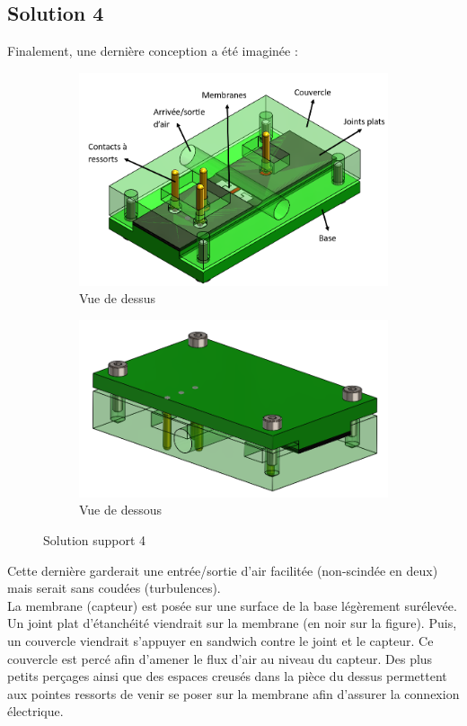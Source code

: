 \subsection{Solution 4}
Finalement, une dernière conception a été imaginée :
\begin{figure}[H]
    \centering
    \begin{subfigure}{0.45\textwidth}
        \includegraphics[scale = 0.45]{images/Design5_dessus.png}
        \caption{Vue de dessus}
    \end{subfigure}
    \hspace{1cm}
    \begin{subfigure}{0.3\textwidth}
        \includegraphics[scale = 0.3]{images/Design5_dessous.png}
        \caption{Vue de dessous}
    \end{subfigure}
    \caption{Solution support 4}
    \label{fig:solution4}
\end{figure}

Cette dernière garderait une entrée/sortie d'air facilitée (non-scindée en deux) mais serait sans coudées (turbulences).\\
La membrane (capteur) est posée sur une surface de la base légèrement surélevée. Un joint plat d'étanchéité viendrait sur la membrane (en noir
sur la figure). Puis, un couvercle viendrait s'appuyer en sandwich contre le joint et le capteur. Ce couvercle est percé afin d'amener le flux 
d'air au niveau du capteur. Des plus petits perçages ainsi que des espaces creusés dans la pièce du dessus permettent aux pointes ressorts de 
venir se poser sur la membrane afin d'assurer la connexion électrique.\\

